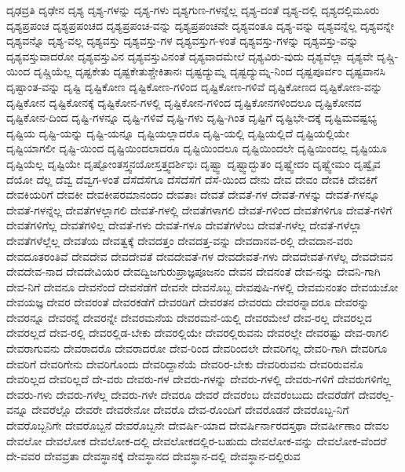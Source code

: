 {ದೃಢವ್ರತಿ
ದೃಢೇನ
ದೃಶ್ಯ
ದೃಶ್ಯ-ಗಳನ್ನು
ದೃಶ್ಯ-ಗಳು
ದೃಶ್ಯಗುಣ-ಗಳನ್ನೆಲ್ಲ
ದೃಶ್ಯ-ದಂತೆ
ದೃಶ್ಯ-ದಲ್ಲಿ
ದೃಶ್ಯದಲ್ಲಿಮೂರು
ದೃಶ್ಯಪ್ರಪಂಚ
ದೃಶ್ಯಪ್ರಪಂಚದ
ದೃಶ್ಯಪ್ರಪಂಚ-ವನ್ನು
ದೃಶ್ಯಪ್ರಪಂಚವೇ
ದೃಶ್ಯವಂತೂ
ದೃಶ್ಯ-ವನ್ನು
ದೃಶ್ಯವನ್ನೆಲ್ಲ
ದೃಶ್ಯವನ್ನೇ
ದೃಶ್ಯವನ್ನೊ
ದೃಶ್ಯ-ವಲ್ಲ
ದೃಶ್ಯವಸ್ತು
ದೃಶ್ಯವಸ್ತು-ಗಳ
ದೃಶ್ಯವಸ್ತುಗ-ಳಂತೆ
ದೃಶ್ಯವಸ್ತು-ಗಳನ್ನು
ದೃಶ್ಯವಸ್ತು-ವನ್ನು
ದೃಶ್ಯವಸ್ತುವಾದರೋ
ದೃಶ್ಯವಸ್ತುವಿನ
ದೃಶ್ಯವಸ್ತುವಿನಂತೆ
ದೃಶ್ಯವಾದಮೇಲೆ
ದೃಶ್ಯವಿರು-ವುದು
ದೃಶ್ಯವೆಲ್ಲಾ
ದೃಶ್ಯವೇ
ದೃಷ್ಚಿ-ಯಿಂದ
ದೃಷ್ಚಿಯೆಲ್ಲ
ದೃಷ್ಟಕೇತು
ದೃಷ್ಟಕೇತುಶ್ಚೇಕಿತಾನಃ
ದೃಷ್ಟದ್ಯುಮ್ನ
ದೃಷ್ಟದ್ಯುಮ್ನ-ನಿಂದ
ದೃಷ್ಟಪೂರ್ವಂ
ದೃಷ್ಟವಾನಸಿ
ದೃಷ್ಟಾಂತ-ವನ್ನು
ದೃಷ್ಟಿ
ದೃಷ್ಟಿಕೋಣ
ದೃಷ್ಟಿಕೋಣ-ಗಳಿಂದ
ದೃಷ್ಟಿಕೋಣ-ಗಳಿವೆ
ದೃಷ್ಟಿಕೋಣದ
ದೃಷ್ಟಿಕೋಣ-ವನ್ನು
ದೃಷ್ಟಿಕೋನ
ದೃಷ್ಟಿಕೋನಕ್ಕೆ
ದೃಷ್ಟಿಕೋನ-ಗಳಲ್ಲಿ
ದೃಷ್ಟಿಕೋನ-ಗಳಿಂದ
ದೃಷ್ಟಿಕೋನಗಳಿಂದಲೂ
ದೃಷ್ಟಿಕೋನದ
ದೃಷ್ಟಿಕೋನ-ದಿಂದ
ದೃಷ್ಟಿ-ಗಳನ್ನೂ
ದೃಷ್ಟಿ-ಗಳಿವೆ
ದೃಷ್ಟಿ-ಗಳು
ದೃಷ್ಟಿ-ಗಿಂತ
ದೃಷ್ಟಿಗೆ
ದೃಷ್ಟಿಭೇ-ದಕ್ಕೆ
ದೃಷ್ಟಿಮವಷ್ಟಭ್ಯ
ದೃಷ್ಟಿಯ
ದೃಷ್ಟಿ-ಯನ್ನು
ದೃಷ್ಟಿ-ಯನ್ನೂ
ದೃಷ್ಟಿಯಲ್ಲಾದರೊ
ದೃಷ್ಟಿ-ಯಲ್ಲಿ
ದೃಷ್ಟಿಯಲ್ಲಿದೆ
ದೃಷ್ಟಿಯಲ್ಲಿಯೇ
ದೃಷ್ಟಿಯಾಗಲೀ
ದೃಷ್ಟಿ-ಯಿಂದ
ದೃಷ್ಟಿಯಿಂದಲಾದರೂ
ದೃಷ್ಟಿಯಿಂದಲೂ
ದೃಷ್ಟಿಯಿಂದಲೇ
ದೃಷ್ಟಿಯಿಂದಲ್ಲ
ದೃಷ್ಟಿಯೂ
ದೃಷ್ಟಿಯೆಲ್ಲ
ದೃಷ್ಟಿಯೇ
ದೃಷ್ಟೋಂತಸ್ತ್ವನಯೋಸ್ತತ್ತ್ವದರ್ಶಿಭಿಃ
ದೃಷ್ಟ್ವಾ
ದೃಷ್ಟ್ವಾದ್ಭುತಂ
ದೃಷ್ಟ್ವೇದಂ
ದೃಷ್ಟ್ವೇಮಂ
ದೃಷ್ವೈವ
ದೆಯೋ
ದೆಲ್ಲ
ದೆವ್ವ
ದೆವ್ವಗ-ಳಂತೆ
ದೆಸೆದೆಸೆಗೂ
ದೆಸೆದೆಸೆಗೆ
ದೆಸೆ-ಯಿಂದ
ದೇನು
ದೇವ
ದೇವಂ
ದೇವಕಿ
ದೇವಕಿಗೆ
ದೇವಕಿಯರಿಗೆ
ದೇವಕೀ
ದೇವಕೀಪರಮಾನಂದಂ
ದೇವತಾಃ
ದೇವತೆ
ದೇವತೆ-ಗಳ
ದೇವತೆ-ಗಳನ್ನು
ದೇವತೆ-ಗಳನ್ನೂ
ದೇವತೆ-ಗಳನ್ನೆಲ್ಲ
ದೇವತೆಗಳಲ್ಲಾಗಲಿ
ದೇವತೆ-ಗಳಲ್ಲಿ
ದೇವತೆಗಳಾಗಲಿ
ದೇವತೆ-ಗಳಿಂದ
ದೇವತೆಗಳಿಗೂ
ದೇವತೆ-ಗಳಿಗೆ
ದೇವತೆಗಳಿಗೆಲ್ಲ
ದೇವತೆಗಳಿಲ್ಲ
ದೇವತೆ-ಗಳು
ದೇವತೆ-ಗಳೂ
ದೇವತೆಗಳೆಂಬ
ದೇವತೆ-ಗಳೆಲ್ಲ
ದೇವತೆ-ಗಳೆಲ್ಲಾ
ದೇವತೆಗಳೆಲ್ಲೆಲ್ಲ
ದೇವತೆಯ
ದೇವತ್ವಕ್ಕೆ
ದೇವದತ್ತಂ
ದೇವದತ್ತ-ವನ್ನು
ದೇವದಾನವ-ರಲ್ಲಿ
ದೇವದಾನ-ವರು
ದೇವದೂತರಂತಿವೆ
ದೇವದೇವ
ದೇವದೇವತೆ
ದೇವದೇವತೆ-ಗಳ
ದೇವದೇವತೆ-ಗಳು
ದೇವದೇವತೆ-ಗಳೆಲ್ಲ
ದೇವದೇವನ
ದೇವದೇವ-ನಾದ
ದೇವದೇವಿಯರ
ದೇವದ್ವಿಜಗುರುಪ್ರಾಜ್ಞಪೂಜನಂ
ದೇವನ
ದೇವನಂತೆ
ದೇವ-ನನ್ನು
ದೇವನಿ-ಗಾಗಿ
ದೇವ-ನಿಗೆ
ದೇವನೂ
ದೇವನೆಂದೆ
ದೇವನೆಡೆಗೆ
ದೇವನೇ
ದೇವನೊಬ್ಬ
ದೇವಪುಷಿ-ಗಳಲ್ಲಿ
ದೇವಮನಂತಂ
ದೇವಯಜೋ
ದೇವಯಜ್ಞ
ದೇವರ
ದೇವರಂತೆ
ದೇವರಕಡೆಗೆ
ದೇವರಡಿಗೆ
ದೇವರತನ
ದೇವರದು
ದೇವರನ್ನಾದರೂ
ದೇವರನ್ನು
ದೇವರನ್ನೂ
ದೇವರನ್ನೆ
ದೇವರನ್ನೇ
ದೇವರಮನೆಯ
ದೇವರಮನೆ-ಯಲ್ಲಿ
ದೇವರಮೇಲೆ
ದೇವ-ರಲ್ಲ
ದೇವರಲ್ಲದ
ದೇವರಲ್ಲದೆ
ದೇವ-ರಲ್ಲಿ
ದೇವರಲ್ಲಿಡ-ಬೇಕು
ದೇವರಲ್ಲಿಯೇ
ದೇವರಲ್ಲಿರುವನು
ದೇವರಲ್ಲೇ
ದೇವರಷ್ಟು
ದೇವ-ರಾಗಲಿ
ದೇವರಾಗುವನು
ದೇವರಾದರೊ
ದೇವರಾದರೋ
ದೇವ-ರಿಂದ
ದೇವರಿಂದಲೇ
ದೇವರಿಗಲ್ಲ
ದೇವರಿ-ಗಾಗಿ
ದೇವರಿಗೂ
ದೇವರಿಗೆ
ದೇವರಿಗೇನು
ದೇವರಿಗೊಂದು
ದೇವರಿದ್ದಾನೆಯೆ
ದೇವರಿರ-ಬೇಕು
ದೇವರಿರುವನು
ದೇವರಿರುವನೊ
ದೇವರಿಲ್ಲದ
ದೇವರಿಲ್ಲದೆ
ದೇ-ವರು
ದೇವರು-ಗಳ
ದೇವರು-ಗಳನ್ನು
ದೇವರು-ಗಳಲ್ಲಿ
ದೇವರು-ಗಳಿಗೆ
ದೇವರುಗಳಿಗೆಲ್ಲ
ದೇವರು-ಗಳು
ದೇವರು-ಗಳೆಲ್ಲ
ದೇವರು-ಗಳೇ
ದೇವರೂ
ದೇವರೆ
ದೇವರೆಂಬ
ದೇವರೆಂಬುದು
ದೇವರೆಡೆಗೆ
ದೇವರೆಲ್ಲ-ವನ್ನೂ
ದೇವರೆಲ್ಲೊ
ದೇವರೇ
ದೇವರೇನೋ
ದೇವರೊ
ದೇವ-ರೊಂದಿಗೆ
ದೇವರೊಡನೆ
ದೇವರೊಬ್ಬ-ನಿಗೆ
ದೇವರೊಬ್ಬನಿಗೇ
ದೇವರೊಬ್ಬನೆ
ದೇವರೊಬ್ಬನೇ
ದೇವರ್ಷಿ-ಯಾದ
ದೇವರ್ಷಿರ್ನಾರದಸ್ತಥಾ
ದೇವರ್ಷೀಣಾಂ
ದೇವಲ
ದೇವಲೋ
ದೇವಲೋಕ
ದೇವಲೋಕ-ದಲ್ಲಿ
ದೇವಲೋಕದಲ್ಲಿರ-ಬಹುದು
ದೇವಲೋಕ-ವನ್ನು
ದೇವಲೋಕ-ವೆಂದರೆ
ದೇ-ವವರ
ದೇವವ್ರತಾ
ದೇವಸ್ಥಾನಕ್ಕೆ
ದೇವಸ್ಥಾನದ
ದೇವಸ್ಥಾನ-ದಲ್ಲಿ
ದೇವಸ್ಥಾನ-ದಲ್ಲಿರುವ
}
